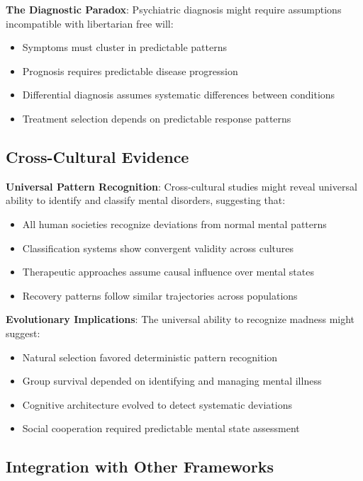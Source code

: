\documentclass[12pt]{article}
\begin{document}
{\textbf{The Diagnostic Paradox}: Psychiatric diagnosis might require assumptions incompatible with libertarian free will:
\begin{itemize}
\item Symptoms must cluster in predictable patterns
\item Prognosis requires predictable disease progression
\item Differential diagnosis assumes systematic differences between conditions
\item Treatment selection depends on predictable response patterns
\end{itemize}

\subsection{Cross-Cultural Evidence}

\textbf{Universal Pattern Recognition}: Cross-cultural studies might reveal universal ability to identify and classify mental disorders, suggesting that:
\begin{itemize}
\item All human societies recognize deviations from normal mental patterns
\item Classification systems show convergent validity across cultures
\item Therapeutic approaches assume causal influence over mental states
\item Recovery patterns follow similar trajectories across populations
\end{itemize}

\textbf{Evolutionary Implications}: The universal ability to recognize madness might suggest:
\begin{itemize}
\item Natural selection favored deterministic pattern recognition
\item Group survival depended on identifying and managing mental illness
\item Cognitive architecture evolved to detect systematic deviations
\item Social cooperation required predictable mental state assessment
\end{itemize}

\subsection{Integration with Other Frameworks}

}
\end{document}
